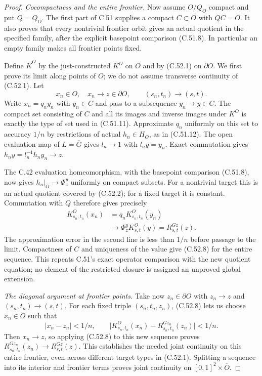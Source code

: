\begin{proof}
\emph{Cocompactness and the entire frontier.}
Now assume $O/Q_O$ compact and put $Q=Q_O$.
The first part of C.51 supplies a compact
$C\subset O$ with $QC=O$. It also proves that
every nontrivial frontier orbit gives an actual
quotient in the specified family, after the
explicit basepoint comparison (C.51.8).
In particular an empty family makes all frontier
points fixed.

Define $\overline K^O$ by the just-constructed
$K^O$ on $O$ and by (C.52.1) on $\partial O$.
We first prove its limit along points of $O$;
we do not assume transverse continuity of
(C.52.1). Let
\[
 x_n\in O,\quad x_n\to z\in\partial O,\qquad
                       (s_n,t_n)\to(s,t).              \tag{C.52.7}
\]
Write $x_n=q_ny_n$ with $y_n\in C$ and pass to
a subsequence $y_n\to y\in C$.
The compact set consisting of $C$ and all its
images and inverse images under $K^O$ is exactly
the type of set used in (C.51.11).
Approximate $q_n$ uniformly on this set to
accuracy $1/n$ by restrictions of actual
$h_n\in H_O$, as in (C.51.12).
The open evaluation map of $L=\overline G$ gives
$l_n\to1$ with $l_ny=y_n$. Exact commutation
gives $h_ny=l_n^{-1}h_ny_n\to z$.

The C.42 evaluation homeomorphism, with the
basepoint comparison (C.51.8), now gives
$h_n|_O\to\Phi_z^y$ uniformly on compact subsets.
For a nontrivial target this is an actual
quotient covered by (C.52.2); for a fixed target
it is constant. Commutation with $Q$ therefore
gives precisely
\[
 \begin{split}
 K^O_{s_n,t_n}(x_n)
   &=q_nK^O_{s_n,t_n}(y_n)\\
   &\longrightarrow
       \Phi_z^y K^O_{s,t}(y)
        =R^{Gz}_{s,t}(z). 
 \end{split}                                             \tag{C.52.8}
\]
The approximation error in the second line is
less than $1/n$ before passage to the limit.
Compactness of $C$ and uniqueness of the value
give (C.52.8) for the entire sequence.
This repeats C.51's exact operator comparison
with the new quotient equation; no element of
the restricted closure is assigned an
unproved global extension.

\emph{The diagonal argument at frontier points.}
Take now $z_n\in\partial O$ with $z_n\to z$
and $(s_n,t_n)\to(s,t)$.
For each fixed triple $(s_n,t_n,z_n)$,
(C.52.8) lets us choose $x_n\in O$ such that
\[
 |x_n-z_n|<1/n,\qquad
 \bigl|K^O_{s_n,t_n}(x_n)
            -R^{Gz_n}_{s_n,t_n}(z_n)\bigr|<1/n.         \tag{C.52.9}
\]
Then $x_n\to z$, so applying (C.52.8) to this
new sequence proves
$R^{Gz_n}_{s_n,t_n}(z_n)\to R^{Gz}_{s,t}(z)$.
This establishes the needed joint continuity
on this entire frontier, even across different
target types in (C.52.1).
Splitting a sequence into its interior and
frontier terms proves joint continuity on
$[0,1]^2\times\overline O$.


\end{proof}
